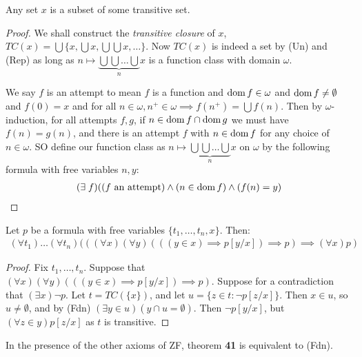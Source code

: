\documentclass[10pt,a4paper]{article}
\begin{document}
\begin{lemma}
Any set $x$ is a subset of some transitive set.
\end{lemma}
\begin{proof}
We shall construct the \emph{transitive closure} of $x$, $TC(x) = \bigcup \{x, \bigcup x, \bigcup\bigcup x, \ldots\}$. Now $TC(x)$ is indeed a set by (Un) and (Rep) as long as $n \mapsto \underbrace{\bigcup\bigcup\ldots\bigcup}_n x$ is a function class with domain $\omega$.

We say $f$ is an attempt to mean $f$ is a function and $\operatorname{dom} f \in \omega$ and $\operatorname{dom} f \neq \emptyset$ and $f(0) = x$ and for all $n \in \omega, n^+ \in \omega \implies f(n^+) = \bigcup f(n)$. Then by $\omega$-induction, for all attempts $f, g$, if $n \in \operatorname{dom} f \cap \operatorname{dom} g$ we must have $f(n)=g(n)$, and there is an attempt $f$ with $n \in \operatorname{dom} f$ for any choice of $n \in \omega$. SO define our function class as $n \mapsto \underbrace{\bigcup\bigcup\ldots\bigcup}_n x$ on $\omega$ by the following formula with free variables $n, y$:
\begin{align*}
(\exists f)((f \text{ an attempt}) \wedge ( n \in \dom f)\wedge(f(n)=y)
\end{align*}
\end{proof}
\begin{theorem}
Let $p$ be a formula with free variables $\{t_1, \ldots, t_n, x\}$. Then:
\begin{align*}
(\forall t_1)\ldots(\forall t_n)(((\forall x)(\forall y)(((y \in x)\implies p[y/x])\implies p)\implies (\forall x)p)
\end{align*}
\end{theorem}
\begin{proof}
Fix $t_1, \ldots, t_n$. Suppose that $(\forall x)(\forall y)(((y \in x)\implies p[y/x])\implies p)$. Suppose for a contradiction that $(\exists x)\neg p$. Let $t = TC(\{x\})$, and let $u = \{z\in t : \neg p[z/x]\}$. Then $x \in u$, so $u \neq \emptyset$, and by (Fdn) $(\exists y \in u)(y \cap u=\emptyset)$. Then $\neg p[y/x]$, but $(\forall z \in y)p[z/x]$ as $t$ is transitive. \contr
\end{proof}
In the presence of the other axioms of ZF, theorem \textbf{41} is equivalent to (Fdn).
\end{document}

